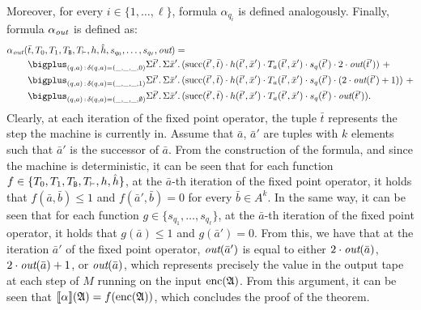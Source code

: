 Moreover, for every $i \in \{1, \ldots, \ell\}$, formula $\alpha_{q_i}$ is defined analogously.
Finally, formula $\alpha_{\text{\it out}}$ is defined as:
\begin{align*}
\alpha_{\out}(&\bar{t},T_0,T_1,T_{\ttB},T_{\vdash},h,\hat{h},s_{q_0},\ldots,s_{q_{\ell}},\out) =\\
&\bigplus_{(q,a) \,:\, \delta(q,a) = (\_,\_,\_,0)}\sa{\bar{t}'}\sa{\bar{x}'}(\successor(\bar{t}',\bar{t}) \mult h(\bar{t}',\bar{x}') \mult T_a(\bar{t}',\bar{x}') \mult s_{q}(\bar{t}') \mult 2\mult \out(\bar{t}')) \ + \\
&\bigplus_{(q,a) \,:\,\delta(q,a) = (\_,\_,\_,1)}\sa{\bar{t}'}\sa{\bar{x}'}(\successor(\bar{t}',\bar{t}) \mult h(\bar{t}',\bar{x}') \mult T_a(\bar{t}',\bar{x}') \mult s_{q}(\bar{t}') \mult (2\mult \out(\bar{t}')+1)) \ + \\ 
&\bigplus_{(q,a) \,:\,\delta(q,a) = (\_,\_,\_,\emptyset)}\sa{\bar{t}'}\sa{\bar{x}'}(\successor(\bar{t}',\bar{t}) \mult h(\bar{t}',\bar{x}') \mult T_a(\bar{t}',\bar{x}') \mult s_{q}(\bar{t}') \mult \out(\bar{t}')).
\end{align*}
Clearly, at each iteration of the fixed point operator, the tuple $\bar{t}$ represents the step the machine is currently in. Assume that $\bar{a}$, $\bar{a}'$ are tuples with $k$ elements such that $\bar{a}'$ is the successor of $\bar{a}$. 
From the construction of the formula, and since the machine is deterministic, it can be seen that for each function $f \in\{T_0,T_1,T_{\mathtt{B}},T_{\vdash},h,\hat{h}\}$, at the $\bar{a}$-th iteration of the fixed point operator, it holds that $f(\bar{a},\bar{b}) \leq 1$ and  $f(\bar{a}',\bar{b}) = 0$ for every $\bar{b}\in A^k$. In the same way, it can be seen that for each function $g \in\{s_{q_1},\ldots,s_{q_{\ell}}\}$, at the $\bar{a}$-th iteration of the fixed point operator, it holds that $g(\bar{a}) \leq 1$ and $g(\bar{a}') = 0$. From this, we have that at the iteration $\bar{a}'$ of the fixed point operator, $\text{\it out}(\bar{a}')$ is equal to either $2\cdot \text{\it out}(\bar{a})$, $2\cdot \text{\it out}(\bar{a}) + 1$, or $\text{\it out}(\bar{a})$, which represents precisely the value in the output tape at each step of $M$ running on the input ${\rm enc}(\mathfrak{A})$. From this argument, it can be seen that ${\llbracket{}{\alpha}\rrbracket}(\mathfrak{A}) = f({\rm enc}(\mathfrak{A}))$, which concludes the proof of the theorem. 
